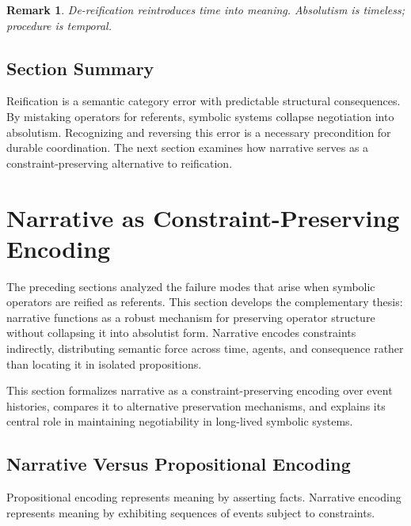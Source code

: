 \documentclass[11pt]{article}
\newtheorem{remark}{Remark}
\begin{document}
\begin{remark}
De-reification reintroduces time into meaning. Absolutism is timeless; procedure
is temporal.
\end{remark}

\subsection{Section Summary}

Reification is a semantic category error with predictable structural
consequences. By mistaking operators for referents, symbolic systems collapse
negotiation into absolutism. Recognizing and reversing this error is a necessary
precondition for durable coordination. The next section examines how narrative
serves as a constraint-preserving alternative to reification.

\section{Narrative as Constraint-Preserving Encoding}

The preceding sections analyzed the failure modes that arise when symbolic
operators are reified as referents. This section develops the complementary
thesis: narrative functions as a robust mechanism for preserving operator
structure without collapsing it into absolutist form. Narrative encodes
constraints indirectly, distributing semantic force across time, agents, and
consequence rather than locating it in isolated propositions.

This section formalizes narrative as a constraint-preserving encoding over event
histories, compares it to alternative preservation mechanisms, and explains its
central role in maintaining negotiability in long-lived symbolic systems.

\subsection{Narrative Versus Propositional Encoding}

Propositional encoding represents meaning by asserting facts. Narrative encoding
represents meaning by exhibiting sequences of events subject to constraints.
\end{document}
